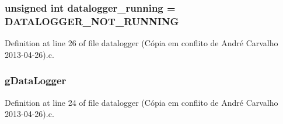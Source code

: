 \hypertarget{datalogger_01_07C_xC3_xB3pia_01em_01conflito_01de_01Andr_xC3_xA9_01Carvalho_012013-04-26_08_8c_a185c3ede96449d14f330fe5ac664e799}{
\subsubsection[{datalogger\-\_\-running}]{\setlength{\rightskip}{0pt plus 5cm}unsigned int datalogger\-\_\-running = {\bf D\-A\-T\-A\-L\-O\-G\-G\-E\-R\-\_\-\-N\-O\-T\-\_\-\-R\-U\-N\-N\-I\-N\-G}}}\label{datalogger_01_07C_xC3_xB3pia_01em_01conflito_01de_01Andr_xC3_xA9_01Carvalho_012013-04-26_08_8c_a185c3ede96449d14f330fe5ac664e799}


Definition at line 26 of file datalogger (\-Cópia em conflito de André Carvalho 2013-\/04-\/26).\-c.

\hypertarget{datalogger_01_07C_xC3_xB3pia_01em_01conflito_01de_01Andr_xC3_xA9_01Carvalho_012013-04-26_08_8c_abe3b9c2c4e21e79c7b046b5986d13acc}{
\subsubsection[{g\-Data\-Logger}]{ g\-Data\-Logger}}\label{datalogger_01_07C_xC3_xB3pia_01em_01conflito_01de_01Andr_xC3_xA9_01Carvalho_012013-04-26_08_8c_abe3b9c2c4e21e79c7b046b5986d13acc}


Definition at line 24 of file datalogger (\-Cópia em conflito de André Carvalho 2013-\/04-\/26).\-c.

